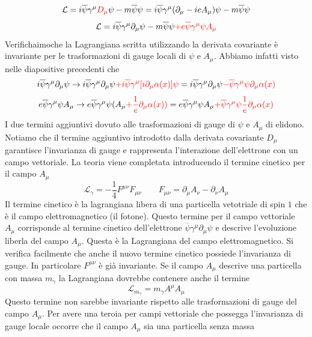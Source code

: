 $$
\mathcal{L} = i\overline{\psi}\gamma^\mu \textcolor{red}{D_\mu}\psi - m\overline{\psi}\psi = i\overline{\psi}\gamma^\mu (\partial_\mu - ieA_\mu)\psi - m\overline{\psi}\psi
$$
$$
\mathcal{L} = i\overline{\psi}\gamma^\mu\partial_\mu\psi - m\overline{\psi}\psi \textcolor{red}{+ e\overline{\psi}\gamma^\mu\psi A_\mu}
$$
Verifichaimoche la Lagrangiana scritta utilizzando la derivata covariante è invariante per le trasformazioni di gauge locali di $\psi$ e $A_\mu$. Abbiamo infatti visto nelle diapositive precedenti che
$$
i\overline{\psi}\gamma^\mu\partial_\mu\psi \to i\overline{\psi}\gamma^\mu\partial_\mu\psi \textcolor{red}{+ i\overline{\psi}\gamma^\mu [i\partial_\mu\alpha(x)]\psi} = i\overline{\psi}\gamma^\mu\partial_\mu\psi \textcolor{red}{- \overline{\psi}\gamma^\mu\psi\partial_\mu\alpha(x)}
$$
$$
e\overline{\psi}\gamma^\mu\psi A_\mu \to e\overline{\psi}\gamma^\mu\psi (A_\mu \textcolor{red}{+ \frac{1}{e}\partial_\mu\alpha(x))} = e\overline{\psi}\gamma^\mu\psi A_\mu\textcolor{red}{ + \overline{\psi}\gamma^\mu\psi\frac{1}{e}\partial_\mu\alpha(x)}
$$
I due termini aggiuntivi dovuto alle trasformazioni di gauge di $\psi$ e $A_\mu$ di elidono. Notiamo che il termine aggiuntivo introdotto dalla derivata covariante $D_\mu$ garantisce l'invarianza di gauge e rappresenta l'interazione dell'elettrone con un campo vettoriale. La teoria viene completata introducendo il termine cinetico per il campo $A_\mu$
$$
\mathcal{L}_\gamma = -\frac{1}{4} F^{\mu\nu} F_{\mu\nu} \qquad F_{\mu\nu} = \partial_\mu A_\nu - \partial_\nu A_\mu
$$
Il termine cinetico è la lagrangiana libera di una particella vetotriale di spin $1$ che è il campo elettromagnetico (il fotone). Questo termine per il campo vettoriale $A_\mu$ corrisponde al termine cinetico dell'elettrone $\overline{\psi}\gamma^\mu\partial_\mu\psi$ e descrive l'evoluzione liberla del campo $A_\mu$. Questa è la Lagrangiana del campo elettromagnetico. Si verifica facilmente che anche il nuovo termine cinetico possiede l'invarianza di gauge. In particolare $F^{\mu\nu}$ è già invariante. Se il campo $A_\mu$ descrive una particella con massa $m_\gamma$ la Lagrangiana dovrebbe contenere anche il termine
$$
\mathcal{L}_{m_\gamma} = m_\gamma A^\mu A_\mu
$$
Questo termine non sarebbe invariante rispetto alle trasformazioni di gauge del campo $A_\mu$. Per avere una teroia per campi vettoriale che possegga l'invarianza di gauge locale occorre che il campo $A_\mu$ sia una particella senza massa
